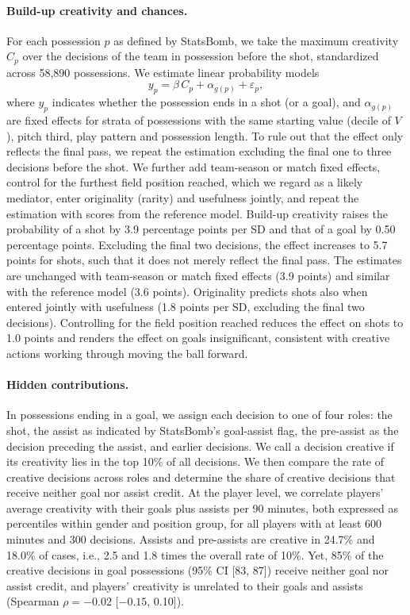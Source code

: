\paragraph{Build-up creativity and chances.} For each possession $p$ as defined by StatsBomb, we take the maximum
creativity $C_p$ over the decisions of the team in possession before the shot, standardized across 58,890
possessions. We estimate linear probability models
\begin{equation*}
y_p = \beta\, C_p + \alpha_{g(p)} + \varepsilon_p,
\end{equation*}
where $y_p$ indicates whether the possession ends in a shot (or a goal), and $\alpha_{g(p)}$ are fixed effects for
strata of possessions with the same starting value (decile of $V$), pitch third, play pattern and possession length.
To rule out that the effect only reflects the final pass, we repeat the estimation excluding the final one to three
decisions before the shot. We further add team-season or match fixed effects, control for the furthest field position
reached, which we regard as a likely mediator, enter originality (rarity) and usefulness jointly, and repeat the
estimation with scores from the reference model. Build-up creativity raises the probability of a shot by 3.9
percentage points per SD and that of a goal by 0.50 percentage points. Excluding the final two decisions, the effect
increases to 5.7 points for shots, such that it does not merely reflect the final pass. The estimates are unchanged
with team-season or match fixed effects (3.9 points) and similar with the reference model (3.6 points). Originality
predicts shots also when entered jointly with usefulness (1.8 points per SD, excluding the final two decisions).
Controlling for the field position reached reduces the effect on shots to 1.0 points and renders the effect on goals
insignificant, consistent with creative actions working through moving the ball forward.

\paragraph{Hidden contributions.} In possessions ending in a goal, we assign each decision to one of four roles: the
shot, the assist as indicated by StatsBomb's goal-assist flag, the pre-assist as the decision preceding the assist,
and earlier decisions. We call a decision creative if its creativity lies in the top 10\% of all decisions. We then
compare the rate of creative decisions across roles and determine the share of creative decisions that receive
neither goal nor assist credit. At the player level, we correlate players' average creativity with their goals plus
assists per 90 minutes, both expressed as percentiles within gender and position group, for all players with at least
600 minutes and 300 decisions. Assists and pre-assists are creative in 24.7\% and 18.0\% of cases, i.e., 2.5 and 1.8
times the overall rate of 10\%. Yet, 85\% of the creative decisions in goal possessions (95\% CI [83, 87]) receive
neither goal nor assist credit, and players' creativity is unrelated to their goals and assists (Spearman
$\rho = -0.02$ [$-0.15$, 0.10]).

